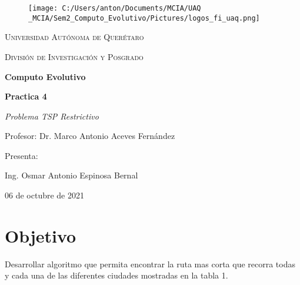 \documentclass[10pt,letterpaper]{article}
\begin{document}
    \begin{titlepage}
     \centering
	   \begin{figure}
            \begin{minipage}{1\linewidth}
            \centering\centering%
            \texttt{[image: C:/Users/anton/Documents/MCIA/UAQ \_MCIA/Sem2\_Computo\_Evolutivo/Pictures/logos\_fi\_uaq.png]}
            \end{minipage}
        \end{figure}
        
        {\scshape\LARGE Universidad Autónoma de Querétaro \par}
	        \vspace{1cm}
	        
	    {\scshape\Large División de Investigación y Posgrado \par}
	        \vspace{1cm}
	        
		{\huge\bfseries Computo Evolutivo\par}
		    \vspace{1cm}
		    
		{\huge\bfseries Practica 4 \par}	
		    \vspace{1cm}
		    
		{\Large\itshape Problema TSP Restrictivo\par}
		    \vspace{1cm}
		    
		Profesor: Dr. Marco Antonio Aceves Fernández \par
		\vspace{1.2cm}
		
		Presenta:\par  \vspace{0.15cm}
		
        Ing. Osmar Antonio Espinosa Bernal
        
		\vfill
		{\large  06 de octubre de 2021\par}
    \end{titlepage}
		\printindex
		
\section{Objetivo}
Desarrollar algoritmo que permita encontrar la ruta mas corta que recorra
todas y cada una de las diferentes ciudades mostradas en la tabla 1.
\end{document}
